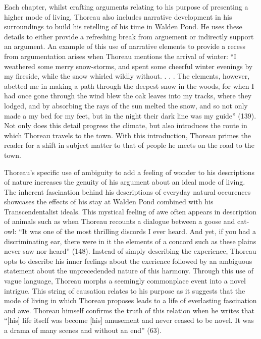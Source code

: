 \documentclass[12pt]{article}
\newcommand{\tq}[2]{
    \fancyhead[L]{\emph{Walden}: Reading Journals}
    \fancyhead[R]{TQ:\ #1 $\vert$ CH: #2}
}
\begin{document}
Each chapter, whilst crafting arguments relating to his purpose of presenting a higher mode of living, Thoreau also includes narrative development in his surroundings to build his retelling of his time in Walden Pond. He uses these details to either provide a refreshing break from arguement or indirectly support an argument. An example of this use of narrative elements to provide a recess from argumentation arises when Thoreau mentions the arrival of winter: ``I weathered some merry snow-storms, and spent some cheerful winter evenings by my fireside, while the snow whirled wildly without. . . . The elements, however, abetted me in making a path through the deepest snow in the woods, for when I had once gone through the wind blew the oak leaves into my tracks, where they lodged, and by absorbing the rays of the sun melted the snow, and so not only made a my bed for my feet, but in the night their dark line was my guide'' (139). Not only does this detail progress the climate, but also introduces the route in which Thoreau travels to the town. With this introduction, Thoreau primes the reader for a shift in subject matter to that of people he meets on the road to the town.

\newpage
\tq{12}{15 - Winter Animals}


Thoreau's specific use of ambiguity to add a feeling of wonder to his descriptions of nature increases the genuity of his argument about an ideal mode of living. The inherent fascination behind his descriptions of everyday natural occurences showcases the effects of his stay at Walden Pond combined with his Transcendentalist ideals. This mystical feeling of awe often appears in  description of animals such as when Thoreau recounts a dialogue between a goose and cat-owl: ``It was one of the most thrilling discords I ever heard. And yet, if you had a discriminating ear, there were in it the elements of a concord such as these plains never saw nor heard'' (148). Instead of simply describing the experience, Thoreau opts to describe his inner feelings about the exerience followed by an ambiguous statement about the unprecedended nature of this harmony. Through this use of vague language, Thoreau morphs a seemingly commonplace event into a novel intrigue. This string of causation relates to his purpose as it suggests that the mode of living in which Thoreau proposes leads to a life of everlasting fascination and awe. Thoreau himself confirms the truth of this relation when he writes that ``[his] life itself was become [his] amusement and never ceased to be novel. It was a drama of many scenes and without an end'' (63).
\end{document}
